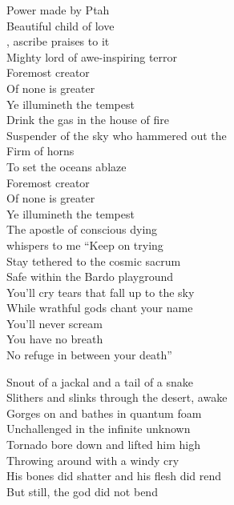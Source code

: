 
Power made by Ptah \\
Beautiful child of love \\
, ascribe praises to it \\
Mighty lord of awe-inspiring terror \\
Foremost creator \\
Of none is greater \\
Ye illumineth the tempest \\

Drink the gas in the house of fire \\
Suspender of the sky who hammered out the  \\
Firm of horns \\
To set the oceans ablaze \\
Foremost creator \\
Of none is greater \\
Ye illumineth the tempest \\

The apostle of conscious dying \\
whispers to me ``Keep on trying \\
Stay tethered to the cosmic sacrum \\
Safe within the Bardo playground \\
You'll cry tears that fall up to the sky \\
While wrathful gods chant your name \\
You'll never scream \\
You have no breath \\
No refuge in between your death'' \\



Snout of a jackal and a tail of a snake \\
Slithers and slinks through the desert, awake \\
Gorges on  and bathes in quantum foam \\
Unchallenged in the infinite unknown \\

Tornado bore down and lifted him high \\
Throwing  around with a windy cry \\
His bones did shatter and his flesh did rend \\
But still, the god did not bend \\


